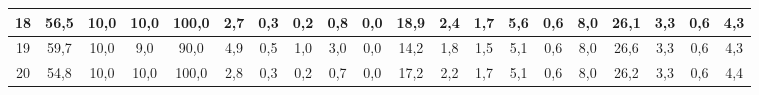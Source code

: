 \begin{sidewaystable}[]
\begin{tabular}{|c|c|c|c|c|c|c|c|c|c|c|c|c|c|c|c|c|c|c|c|}
    18 & 56,5                                            & 10,0                                            & 10,0                                            & 100,0                                           & 2,7                                             & 0,3                                             & 0,2                                             & 0,8                                             & 0,0                                             & 18,9                                             & 2,4                                              & 1,7                                              & 5,6                                              & 0,6                                              & 8,0                                              & 26,1                                             & 3,3                                              & 0,6                                              & 4,3                                              \\ \hline
    19 & 59,7                                            & 10,0                                            & 9,0                                             & 90,0                                            & 4,9                                             & 0,5                                             & 1,0                                             & 3,0                                             & 0,0                                             & 14,2                                             & 1,8                                              & 1,5                                              & 5,1                                              & 0,6                                              & 8,0                                              & 26,6                                             & 3,3                                              & 0,6                                              & 4,3                                              \\ \hline
    20 & 54,8                                            & 10,0                                            & 10,0                                            & 100,0                                           & 2,8                                             & 0,3                                             & 0,2                                             & 0,7                                             & 0,0                                             & 17,2                                             & 2,2                                              & 1,7                                              & 5,1                                              & 0,6                                              & 8,0                                              & 26,2                                             & 3,3                                              & 0,6                                              & 4,4                                              \\ \hline

\end{tabular}
\end{sidewaystable}
